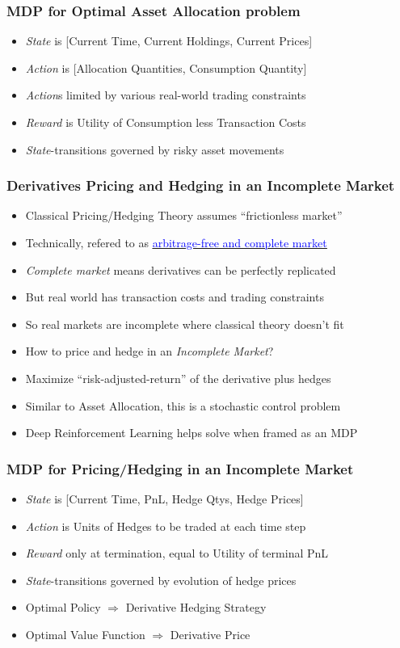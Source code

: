 \documentclass[handout]{beamer}
\begin{document}
\begin{frame}
\frametitle{MDP for Optimal Asset Allocation problem}
\pause
\begin{itemize}[<+->]
\item {\em State} is [Current Time, Current Holdings, Current Prices]
\item {\em Action} is [Allocation Quantities, Consumption Quantity]
\item {\em Action}s limited by various real-world trading constraints
\item {\em Reward} is Utility of Consumption less Transaction Costs
\item {\em State}-transitions governed by risky asset movements
\end{itemize}
\end{frame}

\begin{frame}
\frametitle{Derivatives Pricing and Hedging in an Incomplete Market}
\pause
\begin{itemize}[<+->]
\item Classical Pricing/Hedging Theory assumes ``frictionless market''
\item Technically, refered to as \href{https://github.com/coverdrive/technical-documents/blob/master/finance/ArbitrageCompleteness.pdf}{\underline{\textcolor{blue}{arbitrage-free and complete market}}}
\item {\em Complete market} means derivatives can be perfectly replicated
\item But real world has transaction costs and trading constraints
\item So real markets are incomplete where classical theory doesn't fit
\item How to price and hedge in an {\em Incomplete Market}?
\item Maximize ``risk-adjusted-return'' of the derivative plus hedges
\item Similar to Asset Allocation, this is a stochastic control problem
\item Deep Reinforcement Learning helps solve when framed as an MDP 
\end{itemize}
\end{frame}

\begin{frame}
\frametitle{MDP for Pricing/Hedging in an Incomplete Market}
\pause
\begin{itemize}[<+->]
\item {\em State} is [Current Time, PnL, Hedge Qtys, Hedge Prices]
\item {\em Action} is Units of Hedges to be traded at each time step
\item {\em Reward} only at termination, equal to Utility of terminal PnL
\item {\em State}-transitions governed by evolution of hedge prices
\item Optimal Policy $\Rightarrow$ Derivative Hedging Strategy
\item Optimal Value Function $\Rightarrow$ Derivative Price
\end{itemize}
\end{frame}
\end{document}
